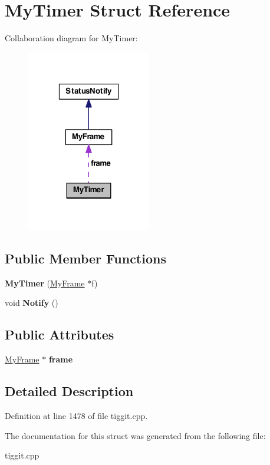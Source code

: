 \hypertarget{struct_my_timer}{\section{My\-Timer Struct Reference}
\label{struct_my_timer}
}


Collaboration diagram for My\-Timer\-:
\nopagebreak
\begin{figure}[H]
\begin{center}
\leavevmode
\includegraphics[width=154pt]{struct_my_timer__coll__graph}
\end{center}
\end{figure}
\subsection*{Public Member Functions}
\begin{DoxyCompactItemize}
\item 
\hypertarget{struct_my_timer_a4461236b599486bab666cdd483e7a947}{{\bfseries My\-Timer} (\hyperlink{class_my_frame}{My\-Frame} $\ast$f)}\label{struct_my_timer_a4461236b599486bab666cdd483e7a947}

\item 
\hypertarget{struct_my_timer_a15adea38e648c9f31a6d78e134b744ec}{void {\bfseries Notify} ()}\label{struct_my_timer_a15adea38e648c9f31a6d78e134b744ec}

\end{DoxyCompactItemize}
\subsection*{Public Attributes}
\begin{DoxyCompactItemize}
\item 
\hypertarget{struct_my_timer_a669500ae63fd7531addf55a812a94c87}{\hyperlink{class_my_frame}{My\-Frame} $\ast$ {\bfseries frame}}\label{struct_my_timer_a669500ae63fd7531addf55a812a94c87}

\end{DoxyCompactItemize}


\subsection{Detailed Description}


Definition at line 1478 of file tiggit.\-cpp.



The documentation for this struct was generated from the following file\-:\begin{DoxyCompactItemize}
\item 
tiggit.\-cpp\end{DoxyCompactItemize}
